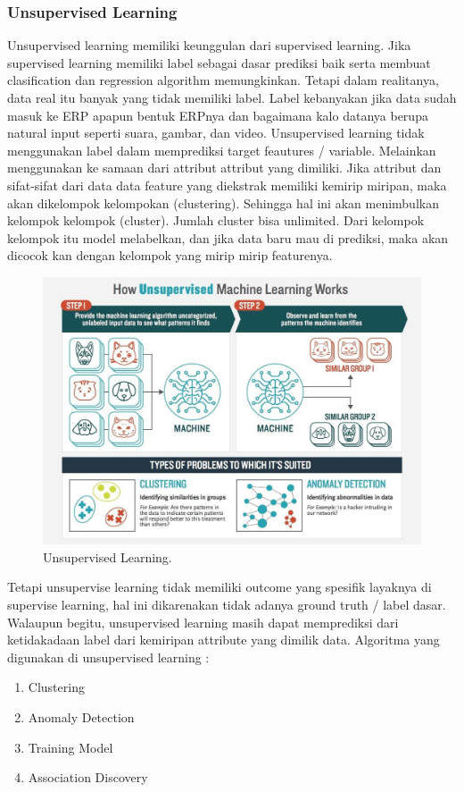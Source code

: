\subsubsection{Unsupervised Learning}
\hfill\break
Unsupervised learning memiliki keunggulan dari supervised learning. Jika supervised learning memiliki label sebagai dasar prediksi baik serta membuat clasification dan regression algorithm memungkinkan. Tetapi dalam realitanya, data real itu banyak yang tidak memiliki label. Label kebanyakan jika data sudah masuk ke ERP apapun bentuk ERPnya dan bagaimana kalo datanya berupa natural input seperti suara, gambar, dan video. Unsupervised learning tidak menggunakan label dalam memprediksi target feautures / variable. Melainkan menggunakan ke samaan dari attribut attribut yang dimiliki. Jika attribut dan sifat-sifat dari data data feature yang diekstrak memiliki kemirip miripan, maka akan dikelompok kelompokan (clustering). Sehingga hal ini akan menimbulkan kelompok kelompok (cluster). Jumlah cluster bisa unlimited. Dari kelompok kelompok itu model melabelkan, dan jika data baru mau di prediksi, maka akan dicocok kan dengan kelompok yang mirip mirip featurenya.
\begin{figure}[H]
	\includegraphics[width=1\textwidth]{figures/1174006/chapter1/unsupervisedlearning.jpg}
	\centering
	\caption{Unsupervised Learning.}
\end{figure}
\noindent
Tetapi unsupervise learning tidak memiliki outcome yang spesifik layaknya di supervise learning, hal ini dikarenakan tidak adanya ground truth / label dasar. Walaupun begitu, unsupervised learning masih dapat memprediksi dari ketidakadaan label dari kemiripan attribute yang dimilik data.
\noindent
Algoritma yang digunakan di unsupervised learning :
\begin{enumerate}
	\item Clustering
    \item Anomaly Detection
    \item Training Model
    \item Association Discovery
\end{enumerate}
